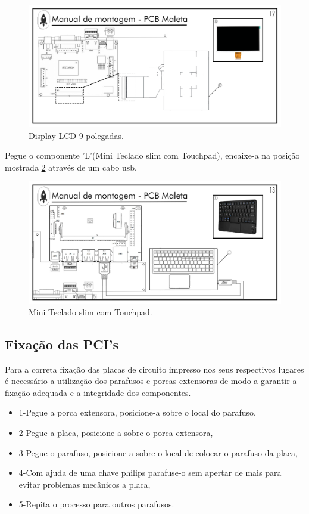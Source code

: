 \begin{figure}[H]
  \centering
  \includegraphics[width=\textwidth]{Figuras/MALETA/Pg-12---PL-01.png}
  \caption{Display LCD 9 polegadas.}
  \label{fig:PCBMALETA display}
\end{figure}
\newpage
\par Pegue o componente 'L'(Mini Teclado slim com Touchpad), encaixe-a na posição mostrada \ref{fig:PCBMALETA Teclado} através de um cabo usb.
\begin{figure}[H]
  \centering
  \includegraphics[width=\textwidth]{Figuras/MALETA/Pg-13---PL-01.png}
  \caption{Mini Teclado slim com Touchpad.}
  \label{fig:PCBMALETA Teclado}
\end{figure}


\subsection{Fixação das PCI's} \label{sec:fixação  }
\par Para a correta fixação das placas de circuito impresso nos seus respectivos lugares é necessário a utilização dos parafusos e porcas extensoras de modo a garantir a fixação adequada e a integridade dos componentes.
\begin{itemize}
    \item 1-Pegue a porca extensora, posicione-a sobre o local do parafuso,
     \item 2-Pegue a placa, posicione-a sobre o porca extensora,
     \item 3-Pegue o parafuso, posicione-a sobre o local de colocar o parafuso da placa,
    \item 4-Com ajuda de uma chave philips parafuse-o sem apertar de mais para evitar problemas mecânicos a placa,
    \item 5-Repita o processo para outros parafusos.
     
\end{itemize}

